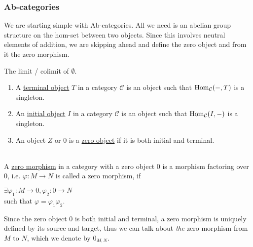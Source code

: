 \subsubsection{Ab-categories}
We are starting simple with Ab-categories. All we need is an abelian group structure on the hom-set between two objects.
Since this involves neutral elements of addition, we are skipping ahead and define the zero object and from it the zero morphism.

\begin{remark}\label{def:init_term_zero_object}
The limit / colimit of $\emptyset$.
\renewcommand{\labelenumi}{(\theenumi)}
\begin{enumerate}
\item A \ul{terminal object} $T$ in a category $\mathcal{C}$ is an object such that $\textup{Hom}_{\mathcal{C}}(-,T)$ is a singleton.
\item An \ul{initial object} $I$ in a category $\mathcal{C}$ is an object such that $\textup{Hom}_{\mathcal{C}}(I,-)$ is a singleton.
\item An object $Z$ or $0$ is a \ul{zero object} if it is both initial and terminal.
\end{enumerate}
\end{remark}

\begin{definition}\label{def:zero_morphism}\phantom{}\\
A \ul{zero morphism} in a category with a zero object $0$ is a morphism factoring over $0$, i.e. $\varphi : M \rightarrow N$ is called a zero
morphism, if\\
\begin{minipage}{.35\textwidth}
\end{minipage}
\begin{minipage}{.65\textwidth}
$\exists \varphi_{1} : M \rightarrow 0, \varphi_{2} : 0 \rightarrow N$\\
such that $\varphi = \varphi_{1}\varphi_{2}$.
\end{minipage}
Since the zero object $0$ is both initial and terminal, a zero morphism is uniquely defined by its source and target, thus we can
talk about \textit{the} zero morphism from $M$ to $N$, which we denote by $0_{M,N}$.
\end{definition}

